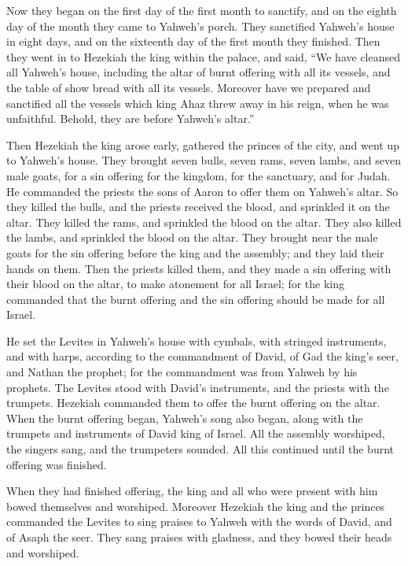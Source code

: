 {Now they began on the first day of the first month to sanctify, and on the eighth day of the month they came to Yahweh’s porch. They sanctified Yahweh’s house in eight days, and on the sixteenth day of the first month they finished.
Then they went in to Hezekiah the king within the palace, and said, “We have cleansed all Yahweh’s house, including the altar of burnt offering with all its vessels, and the table of show bread with all its vessels.
Moreover have we prepared and sanctified all the vessels which king Ahaz threw away in his reign, when he was unfaithful. Behold, they are before Yahweh’s altar.”
\par }{\PP {}Then Hezekiah the king arose early, gathered the princes of the city, and went up to Yahweh’s house.
They brought seven bulls, seven rams, seven lambs, and seven male goats, for a sin offering for the kingdom, for the sanctuary, and for Judah. He commanded the priests the sons of Aaron to offer them on Yahweh’s altar.
So they killed the bulls, and the priests received the blood, and sprinkled it on the altar. They killed the rams, and sprinkled the blood on the altar. They also killed the lambs, and sprinkled the blood on the altar.
They brought near the male goats for the sin offering before the king and the assembly; and they laid their hands on them.
Then the priests killed them, and they made a sin offering with their blood on the altar, to make atonement for all Israel; for the king commanded that the burnt offering and the sin offering should be made for all Israel.
\par }{\PP {}He set the Levites in Yahweh’s house with cymbals, with stringed instruments, and with harps, according to the commandment of David, of Gad the king’s seer, and Nathan the prophet; for the commandment was from Yahweh by his prophets.
The Levites stood with David’s instruments, and the priests with the trumpets.
Hezekiah commanded them to offer the burnt offering on the altar. When the burnt offering began, Yahweh’s song also began, along with the trumpets and instruments of David king of Israel.
All the assembly worshiped, the singers sang, and the trumpeters sounded. All this continued until the burnt offering was finished.
\par }{\PP {}When they had finished offering, the king and all who were present with him bowed themselves and worshiped.
Moreover Hezekiah the king and the princes commanded the Levites to sing praises to Yahweh with the words of David, and of Asaph the seer. They sang praises with gladness, and they bowed their heads and worshiped.
}
